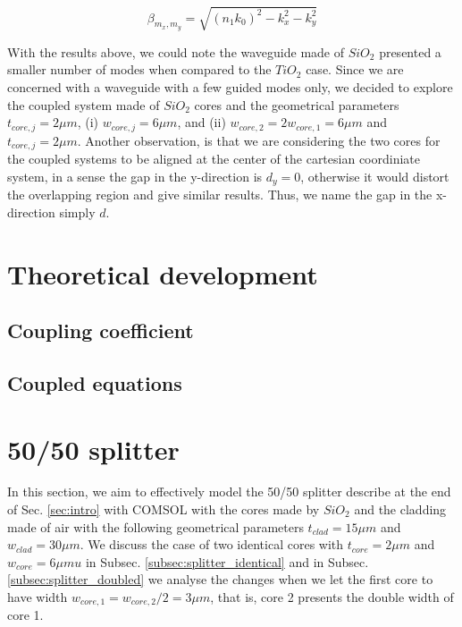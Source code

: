 \documentclass[conference, a4paper]{IEEEtran}
\begin{document}
\begin{equation}
    \beta_{m_x, m_y} = \sqrt{(n_1 k_0)^2 - k_x^2 - k_y^2}
    \label{eq:intro_rectangle}
\end{equation}

With the results above, we could note the waveguide made of $SiO_2$ presented a smaller number of modes when compared to the $TiO_2$ case. Since we are concerned with a waveguide with a few guided modes only, we decided to explore the coupled system made of $SiO_2$ cores and the geometrical parameters $t_{core,j} = 2\mu m$, (i) $w_{core, j} = 6 \mu m$, and (ii) $w_{core, 2} = 2 w_{core, 1} = 6\mu m$ and $t_{core, j} = 2\mu m$. Another observation, is that we are considering the two cores for the coupled systems to be aligned at the center of the cartesian coordiniate system, in a sense the gap in the y-direction is $d_y = 0$, otherwise it would distort the overlapping region and give similar results. Thus, we name the gap in the x-direction simply $d$.

\section{Theoretical development}
\label{sec:theory}

\subsection{Coupling coefficient}
\label{subsec:theory_coefficient}

\subsection{Coupled equations}
\label{subsec:theory_equations}

\section{50/50 splitter}
\label{sec:splitter}

In this section, we aim to effectively model the 50/50 splitter describe at the end of Sec. \ref{sec:intro} with COMSOL with the cores made by $SiO_2$ and the cladding made of air with the following geometrical parameters $t_{clad} = 15\mu m$ and $w_{clad} = 30\mu m$. We discuss the case of two identical cores with $t_{core} = 2\mu m$ and $w_{core} = 6\mu mu$ in Subsec. \ref{subsec:splitter_identical} and in Subsec. \ref{subsec:splitter_doubled} we analyse the changes when we let the first core to have width $w_{core, 1} = w_{core, 2}/2 = 3\mu m$, that is, core 2 presents the double width of core 1.
    
\end{document}
